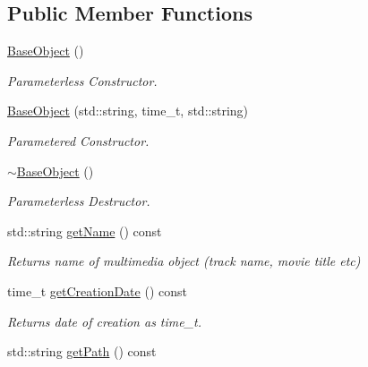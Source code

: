 \subsection*{Public Member Functions}
\begin{DoxyCompactItemize}
\item 
\hypertarget{classBaseObject_ac9e64a371856dc974183c1b04bfdd0c9}{\hyperlink{classBaseObject_ac9e64a371856dc974183c1b04bfdd0c9}{Base\-Object} ()}\label{classBaseObject_ac9e64a371856dc974183c1b04bfdd0c9}

\begin{DoxyCompactList}\small\item\em Parameterless Constructor. \end{DoxyCompactList}\item 
\hypertarget{classBaseObject_aef7d506580d526367abe614c614aaf43}{\hyperlink{classBaseObject_aef7d506580d526367abe614c614aaf43}{Base\-Object} (std\-::string, time\-\_\-t, std\-::string)}\label{classBaseObject_aef7d506580d526367abe614c614aaf43}

\begin{DoxyCompactList}\small\item\em Parametered Constructor. \end{DoxyCompactList}\item 
\hyperlink{classBaseObject_a83eecfd3bdaffda4e6c7d0fb98747f96}{$\sim$\-Base\-Object} ()
\begin{DoxyCompactList}\small\item\em Parameterless Destructor. \end{DoxyCompactList}\item 
\hypertarget{classBaseObject_a813ed6b0e98919c44c5ddf95495bfa2d}{std\-::string \hyperlink{classBaseObject_a813ed6b0e98919c44c5ddf95495bfa2d}{get\-Name} () const }\label{classBaseObject_a813ed6b0e98919c44c5ddf95495bfa2d}

\begin{DoxyCompactList}\small\item\em Returns name of multimedia object (track name, movie title etc) \end{DoxyCompactList}\item 
\hypertarget{classBaseObject_a1d9abdd27cea258333a27d505c57e857}{time\-\_\-t \hyperlink{classBaseObject_a1d9abdd27cea258333a27d505c57e857}{get\-Creation\-Date} () const }\label{classBaseObject_a1d9abdd27cea258333a27d505c57e857}

\begin{DoxyCompactList}\small\item\em Returns date of creation as time\-\_\-t. \end{DoxyCompactList}\item 
\hypertarget{classBaseObject_a46ce6977e2a06f0785aca14454df9d94}{std\-::string \hyperlink{classBaseObject_a46ce6977e2a06f0785aca14454df9d94}{get\-Path} () const }\label{classBaseObject_a46ce6977e2a06f0785aca14454df9d94}


\end{DoxyCompactItemize}
